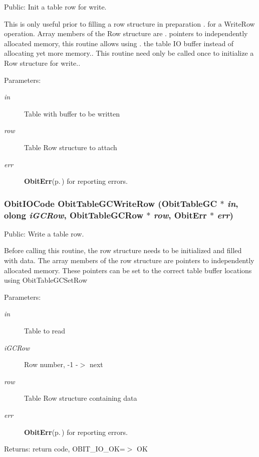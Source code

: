 Public: Init a table row for write. 

This is only useful prior to filling a row structure in preparation . for a Write\-Row operation. Array members of the Row structure are . pointers to independently allocated memory, this routine allows using . the table IO buffer instead of allocating yet more memory.. This routine need only be called once to initialize a Row structure for write.. \begin{Desc}
\item[Parameters:]
\begin{description}
\item[{\em in}]Table with buffer to be written \item[{\em row}]Table Row structure to attach \item[{\em err}]{\bf Obit\-Err}{\rm (p.\,\pageref{structObitErr})} for reporting errors. \end{description}
\end{Desc}
\subsubsection{\setlength{\rightskip}{0pt plus 5cm}Obit\-IOCode Obit\-Table\-GCWrite\-Row ({\bf Obit\-Table\-GC} $\ast$ {\em in}, {\bf olong} {\em i\-GCRow}, {\bf Obit\-Table\-GCRow} $\ast$ {\em row}, {\bf Obit\-Err} $\ast$ {\em err})}\label{ObitTableGC_8h_a20}


Public: Write a table row. 

Before calling this routine, the row structure needs to be initialized and filled with data. The array members of the row structure are pointers to independently allocated memory. These pointers can be set to the correct table buffer locations using Obit\-Table\-GCSet\-Row \begin{Desc}
\item[Parameters:]
\begin{description}
\item[{\em in}]Table to read \item[{\em i\-GCRow}]Row number, -1 -$>$ next \item[{\em row}]Table Row structure containing data \item[{\em err}]{\bf Obit\-Err}{\rm (p.\,\pageref{structObitErr})} for reporting errors. \end{description}
\end{Desc}
\begin{Desc}
\item[Returns:]return code, OBIT\_\-IO\_\-OK=$>$ OK \end{Desc}
